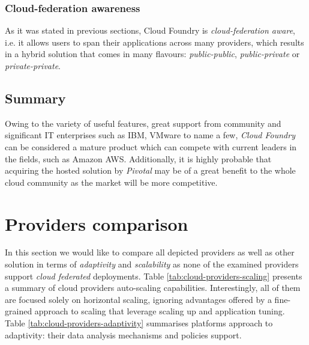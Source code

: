 \subsubsection{Cloud-federation awareness}
As it was stated in previous sections, Cloud Foundry is \emph{cloud-federation aware}, i.e. it allows users to span their applications across many providers, which results in a hybrid solution that comes in many flavours: \emph{public-public}, \emph{public-private} or \emph{private-private}.


\subsection{Summary}
Owing to the variety of useful features, great support from community and significant IT enterprises such as IBM, VMware to name a few, \emph{Cloud Foundry} can be considered a mature product which can compete with current leaders in the fields, such as Amazon AWS.
Additionally, it is highly probable that acquiring the hosted solution by \emph{Pivotal} may be of a great benefit to the whole cloud community as the market will be more competitive.

\section{Providers comparison}
In this section we would like to compare all depicted providers as well as other solution in terms of \emph{adaptivity} and \emph{scalability} as none of the examined providers support \emph{cloud federated} deployments. Table \ref{tab:cloud-providers-scaling} presents a summary of cloud providers auto-scaling capabilities. Interestingly, all of them are focused solely on horizontal scaling, ignoring advantages offered by a fine-grained approach to scaling that leverage scaling up and application tuning. Table \ref{tab:cloud-providers-adaptivity} summarises platforms approach to adaptivity: their data analysis mechanisms and policies support.

